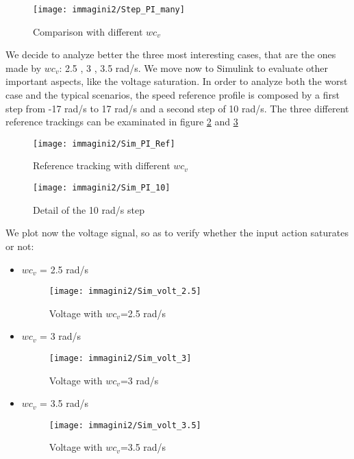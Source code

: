\begin{figure}[h]
	\centering
	\texttt{[image: immagini2/Step\_PI\_many]}
	\caption{Comparison with different $wc_{v}$}
	\label{fig:Comparison with different $wc_{v}$}
\end{figure}

We decide to analyze better the three most interesting cases, that are the ones made by $wc_{v}$: 2.5 , 3 , 3.5 rad/s.
\newline  We move now to Simulink to evaluate other important aspects, like the voltage saturation.
In order to analyze both the worst case and the typical scenarios, the speed reference profile is composed by a first step from -17 rad/s to 17 rad/s and a second step of 10 rad/s. The three different reference trackings can be examinated in figure \ref{fig:Reference tracking with different $wc_{v}$} and \ref{fig:Detail of the 10 rad/s step}

\begin{figure}[h]
	\centering
	\texttt{[image: immagini2/Sim\_PI\_Ref]}
	\caption{Reference tracking with different $wc_{v}$}
	\label{fig:Reference tracking with different $wc_{v}$}
\end{figure}

\begin{figure}[h]
	\centering
	\texttt{[image: immagini2/Sim\_PI\_10]}
	\caption{Detail of the 10 rad/s step}
	\label{fig:Detail of the 10 rad/s step}
\end{figure}

We plot now the voltage signal, so as to verify whether the input action saturates or not:
\begin{itemize}
	\item $wc_{v}$ = 2.5 rad/s
	\begin{figure}[h]
		\centering
		\texttt{[image: immagini2/Sim\_volt\_2.5]}
		\caption{Voltage with $wc_{v}$=2.5 rad/s}
		\label{fig:Voltage with $wc_{v}$=2.5 rad/s}
	\end{figure}
	\item $wc_{v}$ = 3 rad/s
	\begin{figure}[h]
		\centering
		\texttt{[image: immagini2/Sim\_volt\_3]}
		\caption{Voltage with $wc_{v}$=3 rad/s}
		\label{fig:Voltage with $wc_{v}$=3 rad/s}
	\end{figure}
	\item $wc_{v}$ = 3.5 rad/s
	\begin{figure}[h]
		\centering
		\texttt{[image: immagini2/Sim\_volt\_3.5]}
		\caption{Voltage with $wc_{v}$=3.5 rad/s}
		\label{fig:Voltage with $wc_{v}$=3.5 rad/s}
	\end{figure}
\end{itemize}


